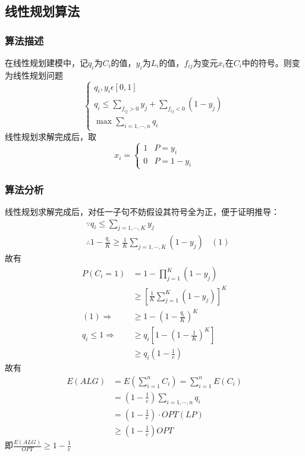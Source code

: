 \subsection{线性规划算法}

\subsubsection{算法描述}

在线性规划建模中，记$q_i$为$C_i$的值，$y_i$为$L_i$的值，$f_{ij}$为变元$x_i$在$C_i$中的符号。则变为线性规划问题
\[
	\begin{cases}
		q_i,y_i\epsilon [0,1]\\
		q_i\leqslant \sum\limits _{f_{ij}>0}y_j+\sum\limits _{f_{ij}<0}(1-y_j)\\
		\max \sum\limits_{i=1,\cdots,n}q_i
	\end{cases}
\]
线性规划求解完成后，取
\[
	x_i=\begin{cases}
		1 &P=y_i\\
		0 &P=1-y_i
	\end{cases}
\]

\subsubsection{算法分析}
线性规划求解完成后，对任一子句不妨假设其符号全为正，便于证明推导：
\begin{displaymath}
	\begin{split}
		&\because q_i\leqslant \sum\limits_{j=1,\cdots,K} y_j\\
		&\therefore 1-\frac{q_i}{K}\geqslant \frac{1}{K}\sum\limits_{j=1,\cdots,K}(1-y_j)\ \ \ \ (1)
	\end{split}
\end{displaymath}
故有
\begin{displaymath}
	\begin{split}
		P(C_i=1)&=1-\prod _{j=1}^K(1-y_j)\\
		&\geqslant[\frac{1}{K}\sum\limits_{j=1}^K(1-y_j)]^K\\
		(1)\Rightarrow &\geqslant 1-(1-\frac{q_i}{K})^K\\
		q_i\leqslant 1\Rightarrow &\geqslant q_i[1-(1-\frac{1}{K})^K]\\
		&\geqslant q_i(1-\frac{1}{e})
	\end{split}
\end{displaymath}
故有
\begin{displaymath}
	\begin{split}
		E(ALG)&=E(\sum\limits_{i=1}^n C_i)=\sum\limits_{i=1}^n E(C_i)\\
		&=(1-\frac{1}{e})\sum\limits_{i=1,\cdots,n}q_i\\
		&=(1-\frac{1}{e})\cdot OPT(LP)\\
		&\geqslant(1-\frac{1}{e})OPT
	\end{split}
\end{displaymath}
即$\frac{E(ALG)}{OPT}\geqslant 1-\frac{1}{e}$
